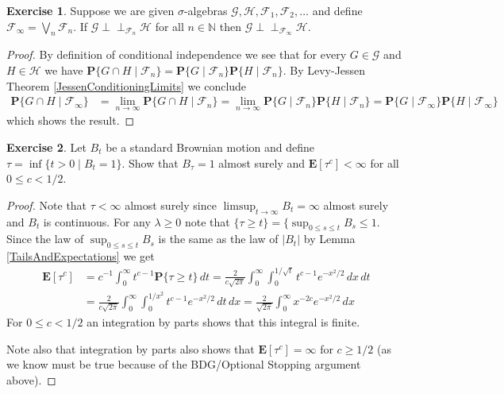 \documentclass{amsbook}
\theoremstyle{definition}
\newtheorem{xca}{Exercise}
\theoremstyle{remark}
\newcommand{\Independent}{\perp \! \! \! \perp}
\newcommand{\cindependent}[3]{#1 \Independent_{#3} #2}
\newcommand{\expectation}[1]{\textbf{E}\left[#1\right]}
\newcommand{\probability}[1]{\textbf{P}\{#1\}}
\newcommand{\cprobability}[2]{\textbf{P}\{#2 \mid #1\}}
\newcommand{\naturals}{\mathbb{N}}
\newcommand{\abs}[1]{\left \vert #1 \right \vert}
\begin{document}
\begin{xca}Suppose we are given $\sigma$-algebras $\mathcal{G},
  \mathcal{H}, \mathcal{F}_1, \mathcal{F}_2, \dotsc$ and define
  $\mathcal{F}_\infty = \bigvee_n \mathcal{F}_n$.  If
  $\cindependent{\mathcal{G}}{\mathcal{H}}{\mathcal{F}_n}$ for all $n
  \in \naturals$ then $\cindependent{\mathcal{G}}{\mathcal{H}}{\mathcal{F}_\infty}$.
\end{xca}
\begin{proof}
By definition of conditional independence we see that for every $G \in
\mathcal{G}$ and $H \in \mathcal{H}$ we have
$\cprobability{\mathcal{F}_n}{G \cap H} =
\cprobability{\mathcal{F}_n}{G} \cprobability{\mathcal{F}_n}{H}$.  By
Levy-Jessen Theorem \ref{JessenConditioningLimits} we conclude
\begin{align*}
\cprobability{\mathcal{F}_\infty}{G \cap H} &=  \lim_{n \to \infty} \cprobability{\mathcal{F}_n}{G \cap H} =
 \lim_{n \to \infty}\cprobability{\mathcal{F}_n}{G}
 \cprobability{\mathcal{F}_n}{H} = \cprobability{\mathcal{F}_\infty}{G}
 \cprobability{\mathcal{F}_\infty}{H}
\end{align*}
which shows the result.
\end{proof}

\begin{xca}Let $B_t$ be a standard Brownian motion and define $\tau =
  \inf \lbrace t > 0 \mid B_t = 1 \rbrace$.  Show that
  $B_\tau = 1$ almost surely and $\expectation{\tau^c} < \infty$ for
  all $0 \leq c < 1/2$.
\end{xca}
\begin{proof}
Note that $\tau < \infty$ almost surely since $\limsup_{t \to \infty}
B_t = \infty$ almost surely and $B_t$ is continuous.  For any $\lambda
\geq 0$ note that $ \lbrace \tau \geq t \rbrace = \lbrace
\sup_{0 \leq s \leq t} B_s \leq 1$.  Since the law of $\sup_{0 \leq s
  \leq t} B_s$ is the same as the law of $\abs{B_t}$ by Lemma
\ref{TailsAndExpectations} we get
\begin{align*}
\expectation{\tau^c} &= c^{-1} \int_0^\infty t^{c-1} \probability{\tau
  \geq t} \, dt = \frac{2}{c \sqrt{2\pi}} \int_0^\infty
\int_0^{1/\sqrt{t}}  t^{c-1} e^{-x^2/2} \, dx \, dt \\
&= \frac{2}{c \sqrt{2\pi}} \int_0^\infty
\int_0^{1/x^2}  t^{c-1} e^{-x^2/2} \, dt \, dx = \frac{2}{\sqrt{2\pi}}
\int_0^\infty x^{-2c} e^{-x^2/2} \, dx 
\end{align*}
For $0 \leq c < 1/2$ an integration by parts shows that this integral
is finite.

Note also that integration by parts also shows that
$\expectation{\tau^c} = \infty$ for $c \geq 1/2$ (as we know must be
true because of the BDG/Optional Stopping argument above).
\end{proof}
\end{document}
